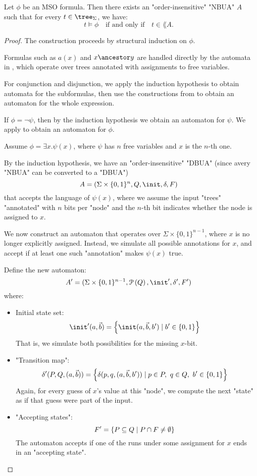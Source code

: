 \documentclass[a4paper,UKenglish,cleveref, autoref, thm-restate]{lipics-v2021}
\begin{document}
\begin{lemma}\label{lem:MSO-to-aut}
	Let $\phi$ be an MSO formula. Then there exists an "order-insensitive" "NBUA" $A$ such that for every $t \in \tree_\Sigma$, we have:
	\[
		t \models \phi \quad \text{if and only if} \quad t \in \lang{A}.
	\]
\end{lemma}

\begin{proof}
	The construction proceeds by structural induction on $\phi$.

	Formulas such as $a(x)$ and $x \ancestor y$ are handled directly by the automata
	in , which operate over trees annotated with assignments to free variables.

	For conjunction and disjunction, we apply the induction hypothesis to obtain automata
	for the subformulas, then use the constructions from  to obtain an automaton for the whole expression.

	If $\phi = \lnot \psi$, then by the induction hypothesis we obtain an automaton for $\psi$. We apply
	 to obtain an automaton for $\phi$.

	Assume $\phi = \exists x.\psi(x)$, where $\psi$ has $n$ free variables and $x$ is the $n$-th one.

	By the induction hypothesis, we have an "order-insensitive" "DBUA" (since avery "NBUA" can be converted to a "DBUA")
	\[
		A = (\Sigma \times \{0,1\}^n, Q, \init, \delta, F)
	\]
	that accepts the language of $\psi(x)$, where we assume the input "trees" "annotated" with $n$ bits per "node" and the $n$-th bit indicates
	whether the node is assigned to $x$.

	We now construct an automaton that operates over $\Sigma \times \{0,1\}^{n-1}$, where $x$ is no longer explicitly assigned.
	Instead, we simulate all possible annotations for $x$, and accept if at least one such "annotation" makes $\psi(x)$ true.

	Define the new automaton:
	\[
		A' = (\Sigma \times \{0,1\}^{n-1}, \parts Q, \init', \delta', F')
	\]
	where:
	\begin{itemize}
		\item Initial state set:
		      \[
			      \init'(a, \vec{b}) = \setdef{ \init(a, \vec{b}, b')} {b' \in \{0,1\} }
		      \]
		      That is, we simulate both possibilities for the missing $x$-bit.
		\item "Transition map":
		      \[
			      \delta'(P, Q, (a, \vec{b})) = \left\{ \delta(p, q, (a, \vec{b}, b')) \mid p \in P,\ q \in Q,\ b' \in \{0,1\} \right\}
		      \]
		      Again, for every guess of $x$’s value at this "node", we compute the next "state" as if that guess were part of the input.
		\item "Accepting states":
		      \[
			      F' = \left\{ P \subseteq Q \mid P \cap F \neq \emptyset \right\}
		      \]
		      The automaton accepts if one of the runs under some assignment for $x$ ends in an "accepting state".
	\end{itemize}


\end{proof}
\end{document}
